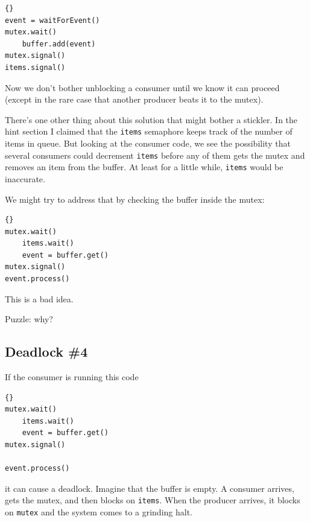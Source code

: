 \documentclass{book}
\newcommand{\clearemptydoublepage}{\newpage\cleardoublepage}
\begin{document}
\begin{latin}
\begin{latin}
\begin{lstlisting}[title={Improved producer solution}]{}
event = waitForEvent()
mutex.wait()
    buffer.add(event)
mutex.signal()
items.signal()
\end{lstlisting}
\end{latin}
\end{latin}

Now we don't bother unblocking a consumer until we know it can proceed
(except in the rare case that another producer beats it to the mutex).

There's one other thing about this solution that might bother
a stickler.  In the hint section I claimed that the {\tt items}
semaphore keeps track of the number of items in queue.  But looking
at the consumer code, we see the possibility that several consumers
could decrement {\tt items} before any of them gets the mutex
and removes an item from the buffer.  At least for a little while,
{\tt items} would be inaccurate.

We might try to address that by checking the buffer inside the
mutex:

\begin{latin}
\begin{latin}
\begin{lstlisting}[title={Broken consumer solution}]{}
mutex.wait()
    items.wait()
    event = buffer.get()
mutex.signal()
event.process()
\end{lstlisting}
\end{latin}
\end{latin}

This is a bad idea.

Puzzle: why?


\clearemptydoublepage
\subsection{Deadlock \#4}

If the consumer is running this code

\begin{latin}
\begin{latin}
\begin{lstlisting}[title={Broken consumer solution}]{}
mutex.wait()
    items.wait()
    event = buffer.get()
mutex.signal()

event.process()
\end{lstlisting}
\end{latin}
\end{latin}
%
it can cause a deadlock.  Imagine that the buffer is empty.
A consumer arrives, gets the mutex, and then blocks on
{\tt items}.  When the producer arrives, it blocks on
{\tt mutex} and the system comes to a grinding halt.
\end{document}
